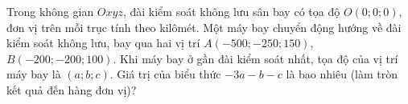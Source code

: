 \begin{ex}
Trong không gian $Oxyz$, đài kiểm soát không lưu sân bay có tọa độ $O(0;0;0)$, đơn vị trên mỗi trục tính theo kilômét. Một máy bay chuyển động hướng về đài kiểm soát không lưu, bay qua hai vị trí $A(-500;-250;150)$, $B(-200;-200;100)$. Khi máy bay ở gần đài kiểm soát nhất, tọa độ của vị trí máy bay là $(a;b;c)$. Giá trị của biểu thức $-3a-b-c$ là bao nhiêu (làm tròn kết quả đến hàng đơn vị)?
\end{ex}
